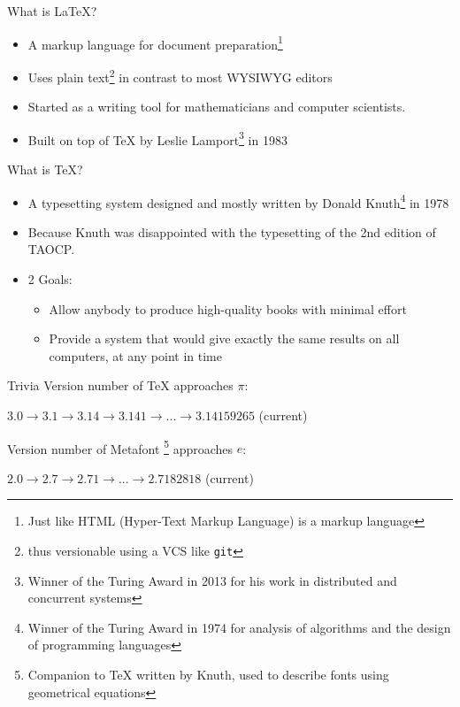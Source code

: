 \documentclass[12pt]{beamer}
\begin{document}
\begin{frame}{What is \LaTeX{}?}
  \begin{itemize}
    \item A markup language for document preparation\footnote{Just like HTML (Hyper-Text Markup Language) is a markup language}
    \item Uses plain text\footnote{thus versionable using a VCS like \texttt{git}} in contrast to most WYSIWYG editors
    \item Started as a writing tool for mathematicians and computer scientists.
    \item Built on top of \TeX{} by Leslie Lamport\footnote{Winner of the Turing Award in 2013 for his work in distributed and concurrent systems} in 1983
  \end{itemize}
\end{frame}

\begin{frame}{What is \TeX{}?}
  \begin{itemize}
    \item A typesetting system designed and mostly written by Donald Knuth\footnote{Winner of the Turing Award in 1974 for analysis of algorithms and the design of programming languages} in 1978
    \item Because Knuth was disappointed with the typesetting of the 2nd edition of TAOCP.
    \item 2 Goals:
          \begin{itemize}
            \item Allow anybody to produce high-quality books with minimal effort
            \item Provide a system that would give exactly the same results on all computers, at any point in time
          \end{itemize}
  \end{itemize}
\end{frame}

\begin{frame}{Trivia}
  Version number of \TeX{} approaches $\pi$:

  $3.0 \rightarrow 3.1 \rightarrow 3.14 \rightarrow 3.141 \rightarrow ... \rightarrow 3.14159265$ (current)

  Version number of Metafont \footnote{Companion to \TeX{} written by Knuth, used to describe fonts using geometrical equations} approaches $e$:

  $2.0 \rightarrow 2.7 \rightarrow 2.71 \rightarrow ... \rightarrow 2.7182818$ (current)
\end{frame}
\end{document}
